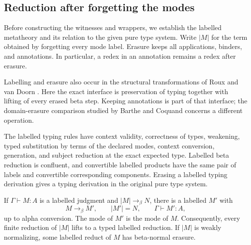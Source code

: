 \subsection{Reduction after forgetting the modes}
\label{sec:normal-erasure}

Before constructing the witnesses and wrappers, we establish the
labelled metatheory and its relation to the given pure type system.  Write $|M|$ for the term obtained by
forgetting every mode label.  Erasure keeps all applications, binders, and
annotations.  In particular, a redex in an annotation remains a redex after
erasure.

Labelling and erasure also occur in the structural transformations of
Roux and van Doorn \cite[Sections~3--4]{RouxVanDoorn2014}.
Here the exact interface is preservation of typing together with lifting
of every erased beta step. Keeping annotations is part of that interface;
the domain-erasure comparison studied by Barthe and Coquand
\cite[Theorem~17]{BartheCoquand2006} concerns a different operation.

\begin{lemma}
\label{lem:enc-labelled-metatheory}
The labelled typing rules have context validity, correctness of types,
weakening, typed substitution by terms of the declared modes, context
conversion, generation, and subject reduction at the exact expected type.
Labelled beta reduction is confluent, and convertible
labelled products have the same pair of labels and convertible corresponding
components.  Erasing a labelled typing derivation gives a typing derivation
in the original pure type system.

If $\Gamma\vdash M:A$ is a labelled judgment and
$|M|\longrightarrow_\beta N$, there is a labelled $M'$ with
\[
 M\longrightarrow_\beta M',\qquad |M'|=N,
 \qquad \Gamma\vdash M':A,
\]
up to alpha conversion.  The mode of $M'$ is the mode of $M$.
Consequently, every finite reduction of $|M|$ lifts to a typed labelled
reduction.  If $|M|$ is weakly normalizing, some labelled reduct of $M$ has
beta-normal erasure.
\end{lemma}

